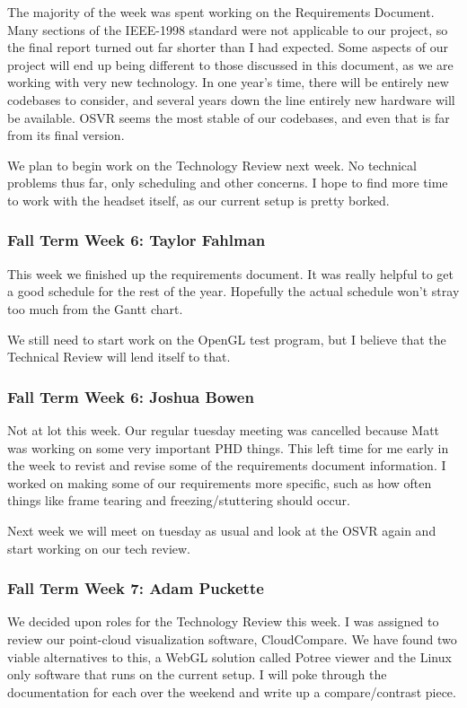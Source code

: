 \documentclass[draftclsnofoot,onecolumn]{IEEEtran}
\begin{document}
The majority of the week was spent working on the Requirements Document. Many sections of the IEEE-1998 standard were not applicable to our project, so the final report turned out far shorter than I had expected. Some aspects of our project will end up being different to those discussed in this document, as we are working with very new technology. In one year's time, there will be entirely new codebases to consider, and several years down the line entirely new hardware will be available. OSVR seems the most stable of our codebases, and even that is far from its final version.

We plan to begin work on the Technology Review next week. No technical problems thus far, only scheduling and other concerns. I hope to find more time to work with the headset itself, as our current setup is pretty borked.

\subsubsection{Fall Term Week 6: Taylor Fahlman}

This week we finished up the requirements document. It was really helpful to get a good schedule for the rest of the year. Hopefully the actual schedule won't stray too much from the Gantt chart.

We still need to start work on the OpenGL test program, but I believe that the Technical Review will lend itself to that.

\subsubsection{Fall Term Week 6: Joshua Bowen}

Not at lot this week. Our regular tuesday meeting was cancelled because Matt was working on some very important PHD things. This left time for me early in the week to revist and revise some of the requirements document information. I worked on making some of our requirements more specific, such as how often things like frame tearing and freezing/stuttering should occur.

Next week we will meet on tuesday as usual and look at the OSVR again and start working on our tech review.

\subsubsection{Fall Term Week 7: Adam Puckette}

We decided upon roles for the Technology Review this week. I was assigned to review our point-cloud visualization software, CloudCompare. We have found two viable alternatives to this, a WebGL solution called Potree viewer and the Linux only software that runs on the current setup. I will poke through the documentation for each over the weekend and write up a compare/contrast piece.
\end{document}
